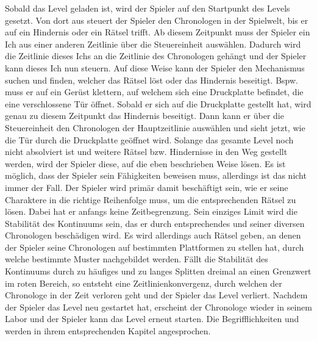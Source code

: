 Sobald das Level geladen ist, wird der Spieler auf den Startpunkt des Levels gesetzt. Von dort aus steuert der Spieler den Chronologen in der Spielwelt, bis er auf ein Hindernis oder ein Rätsel trifft. Ab diesem Zeitpunkt muss der Spieler ein Ich aus einer anderen Zeitlinie über die Steuereinheit auswählen. Dadurch wird die Zeitlinie dieses Ichs an die Zeitlinie des Chronologen gehängt und der Spieler kann dieses Ich nun steuern. Auf diese Weise kann der Spieler den Mechanismus suchen und finden, welcher das Rätsel löst oder das Hindernis beseitigt. Bspw. muss er auf ein Gerüst klettern, auf welchem sich eine Druckplatte befindet, die eine verschlossene Tür öffnet. Sobald er sich auf die Druckplatte gestellt hat, wird genau zu diesem Zeitpunkt das Hindernis beseitigt. Dann kann er über die Steuereinheit den Chronologen der Hauptzeitlinie auswählen und sieht jetzt, wie die Tür durch die Druckplatte geöffnet wird. Solange das gesamte Level noch nicht absolviert ist und weitere Rätsel bzw. Hindernisse in den Weg gestellt werden, wird der Spieler diese, auf die eben beschrieben Weise lösen. Es ist möglich, dass der Spieler sein  Fähigkeiten beweisen muss, allerdings ist das nicht immer der Fall. Der Spieler wird primär damit beschäftigt sein, wie er seine Charaktere in die richtige Reihenfolge  muss, um die entsprechenden Rätsel zu lösen. Dabei hat er anfangs keine Zeitbegrenzung. Sein einziges Limit wird die Stabilität des Kontinuums sein, das er durch entsprechendes  und  seiner diversen Chronologen beschädigen wird. Es wird allerdings auch Rätsel geben, an denen der Spieler seine Chronologen auf bestimmten Plattformen zu stellen hat, durch welche bestimmte Muster nachgebildet werden. 
Fällt die Stabilität des Kontinuums durch zu häufiges und zu langes Splitten dreimal an einen Grenzwert im roten Bereich, so entsteht eine Zeitlinienkonvergenz, durch welchen der Chronologe in der Zeit verloren geht und der Spieler das Level verliert. Nachdem der Spieler das Level neu gestartet hat, erscheint der Chronologe wieder in seinem Labor und der Spieler kann das Level erneut starten.
Die Begrifflichkeiten  und  werden in ihrem entsprechenden Kapitel angesprochen.

